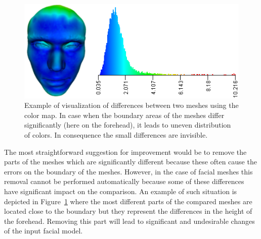 \documentclass[final,5p,times]{elsarticle}
\begin{document}
\begin{figure}[htb]
	\centering
  \includegraphics[width=0.9\linewidth]{pictures/colormap.png}
  \caption{\label{fig:colormap} Example of visualization of differences between two meshes using the color map. In case when the boundary areas of the meshes differ significantly (here on the forehead), it leads to uneven distribution of colors. In consequence the small differences are invisible.}
\end{figure}

The most straightforward suggestion for improvement would be to remove the parts of the meshes which are significantly different because these often cause the errors on the boundary of the meshes.
However, in the case of facial meshes this removal cannot be performed automatically because some of these differences have significant impact on the comparison.
An example of such situation is depicted in Figure~\ref{fig:colormap} where the most different parts of the compared meshes are located close to the boundary but they represent the differences in the height of the forehead.
Removing this part will lead to significant and undesirable changes of the input facial model.
\end{document}
